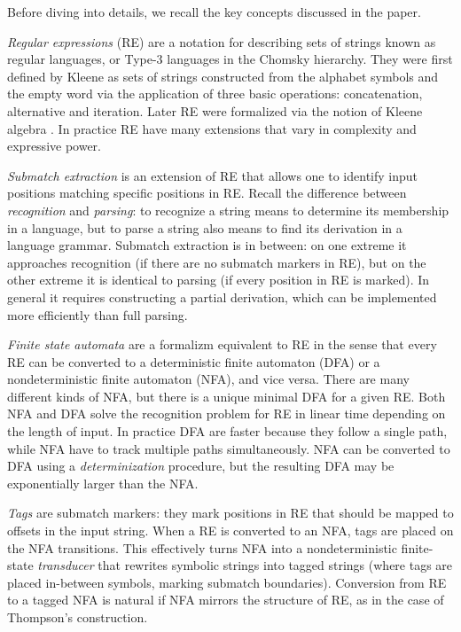 \documentclass[]{article}
\begin{document}
Before diving into details, we recall the key concepts discussed in the paper.
\medskip

\emph{Regular expressions} (RE) are a notation for describing sets of strings known as regular languages, or Type-3 languages in the Chomsky hierarchy.
They were first defined by Kleene \cite{Kle51} as sets of strings constructed from the alphabet symbols and the empty word via the application of three basic operations: concatenation, alternative and iteration.
Later RE were formalized via the notion of Kleene algebra \cite{Koz94}.
In practice RE have many extensions that vary in complexity and expressive power.
\medskip

\emph{Submatch extraction} is an extension of RE that allows one to
identify input positions matching specific positions in RE.
Recall the difference between \emph{recognition} and \emph{parsing}:
to recognize a string means to determine its membership in a language,
but to parse a string also means to find its derivation in a language grammar.
Submatch extraction is in between:
on one extreme it approaches recognition (if there are no submatch markers in RE),
but on the other extreme it is identical to parsing (if every position in RE is marked).
In general it requires constructing a partial derivation,
which can be implemented more efficiently than full parsing.
\medskip

\emph{Finite state automata} are a formalizm equivalent to RE
in the sense that every RE can be converted to a deterministic finite automaton (DFA)
or a nondeterministic finite automaton (NFA), and vice versa.
There are many different kinds of NFA, but there is a unique minimal DFA for a given RE.
Both NFA and DFA solve the recognition problem for RE in linear time depending on the length of input.
In practice DFA are faster because they follow a single path,
while NFA have to track multiple paths simultaneously.
NFA can be converted to DFA using a \emph{determinization} procedure,
but the resulting DFA may be exponentially larger than the NFA.
\medskip

\emph{Tags} are submatch markers: they mark positions in RE that should be mapped to offsets in the input string.
When a RE is converted to an NFA, tags are placed on the NFA transitions.
This effectively turns NFA into a nondeterministic finite-state \emph{transducer}
that rewrites symbolic strings into tagged strings (where tags are placed in-between symbols, marking submatch boundaries).
Conversion from RE to a tagged NFA is natural if NFA mirrors the structure of RE, as in the case of Thompson's construction.
\medskip
\end{document}
